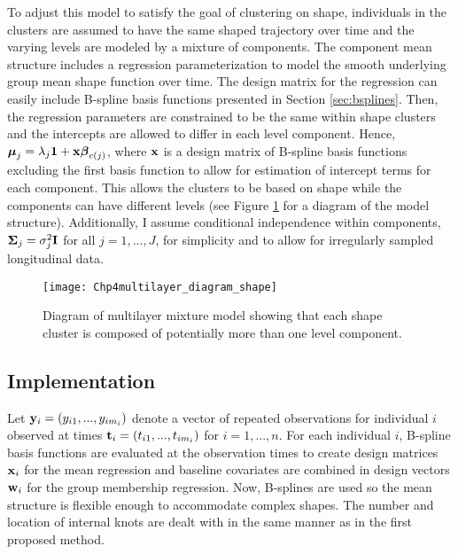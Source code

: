 To adjust this model to satisfy the goal of clustering on shape, individuals in the clusters are assumed to have the same shaped trajectory over time and the varying levels are modeled by a mixture of components. The component mean structure includes a regression parameterization to model the smooth underlying group mean shape function over time. The design matrix for the regression can easily include B-spline basis functions presented in Section \ref{sec:bsplines}. Then, the regression parameters are constrained to be the same within shape clusters and the intercepts are allowed to differ in each level component. Hence, $\boldsymbol\mu_{j}=\lambda_{j}\mathbf 1+\mathbf x \boldsymbol\beta_{c(j)}$, where $\mathbf x$ is a design matrix of B-spline basis functions excluding the first basis function to allow for estimation of intercept terms for each component. This allows the clusters to be based on shape while the components can have different levels (see Figure \ref{fig:diashape} for a diagram of the model structure). Additionally, I assume conditional independence within components, $\boldsymbol\Sigma_{j}=\sigma^{2}_{j}\mathbf I$ for all $j=1,...,J$,  for simplicity and to allow for irregularly sampled longitudinal data.
\begin{figure}[h]
\centering
\texttt{[image: Chp4multilayer\_diagram\_shape]}
\caption{Diagram of multilayer mixture model showing that each shape cluster is composed of potentially more than one level component.}
\label{fig:diashape}
\end{figure}

\subsection{Implementation}
Let $\mathbf y_{i}=(y_{i1},...,y_{im_{i}})$ denote a vector of repeated observations for individual $i$ observed at times $\mathbf t_{i}=(t_{i1},...,t_{im_{i}})$  for $i=1,...,n$. For each individual $i$, B-spline basis functions are evaluated at the observation times to create design matrices $\mathbf x_{i}$ for the mean regression and baseline covariates are combined in design vectors $\mathbf w_{i}$ for the group membership regression. Now, B-splines are used so the mean structure is flexible enough to accommodate complex shapes. The number and location of internal knots are dealt with in the same manner as in the first proposed method.


